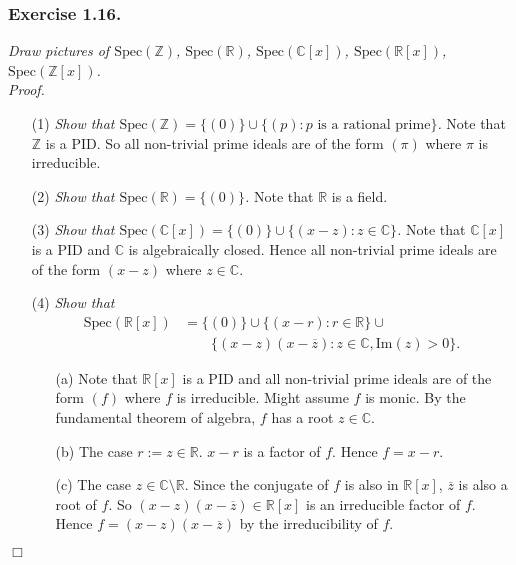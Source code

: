 \documentclass{article}
\begin{document}



\subsubsection*{Exercise 1.16.}
\emph{Draw pictures of
$\mathrm{Spec}(\mathbb{Z})$,
$\mathrm{Spec}(\mathbb{R})$,
$\mathrm{Spec}(\mathbb{C}[x])$,
$\mathrm{Spec}(\mathbb{R}[x])$,
$\mathrm{Spec}(\mathbb{Z}[x])$.} \\



\emph{Proof.}
\begin{enumerate}
\item[(1)]
  \emph{Show that $\mathrm{Spec}(\mathbb{Z}) = \{ (0) \} \cup \{ (p) : \text{$p$ is a rational prime} \}$.}
  Note that $\mathbb{Z}$ is a PID.
  So all non-trivial prime ideals are of the form $(\pi)$ where $\pi$ is irreducible.

\item[(2)]
  \emph{Show that $\mathrm{Spec}(\mathbb{R}) = \{ (0) \}$.}
  Note that $\mathbb{R}$ is a field.

\item[(3)]
  \emph{Show that $\mathrm{Spec}(\mathbb{C}[x]) = \{ (0) \} \cup \{ (x - z) : z \in \mathbb{C} \}$.}
  Note that $\mathbb{C}[x]$ is a PID and $\mathbb{C}$ is algebraically closed.
  Hence all non-trivial prime ideals are of the form $(x - z)$ where $z \in \mathbb{C}$.

\item[(4)]
  \emph{Show that}
  \begin{align*}
    \mathrm{Spec}(\mathbb{R}[x])
    & =
    \{ (0) \} \cup \{ (x - r) : r \in \mathbb{R} \} \cup \\
    & \qquad
    \{ (x - z)(x - \overline{z}) : z \in \mathbb{C}, \mathrm{Im}(z) > 0 \}.
  \end{align*}
  \begin{enumerate}
  \item[(a)]
    Note that $\mathbb{R}[x]$ is a PID and
    all non-trivial prime ideals are of the form $(f)$ where $f$ is irreducible.
    Might assume $f$ is monic.
    By the fundamental theorem of algebra, $f$ has a root $z \in \mathbb{C}$.

  \item[(b)]
    The case $r := z \in \mathbb{R}$.
    $x - r$ is a factor of $f$.
    Hence $f = x - r$.

  \item[(c)]
    The case $z \in \mathbb{C} \setminus \mathbb{R}$. 
    Since the conjugate of $f$ is also in $\mathbb{R}[x]$, $\overline{z}$ is also a root of $f$.
    So $(x - z)(x - \overline{z}) \in \mathbb{R}[x]$ is an irreducible factor of $f$.
    Hence $f = (x - z)(x - \overline{z})$ by the irreducibility of $f$.
  \end{enumerate}
\end{enumerate}
$\Box$ \\\\
\end{document}

